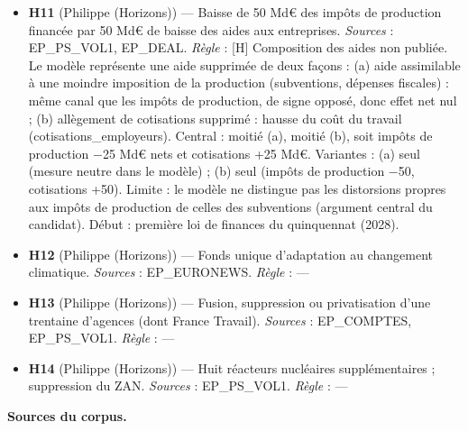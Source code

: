 \documentclass[
  11pt,
  11pt,
  a4paper,
  openany]{book}
\begin{document}
\begin{itemize}
  premier achat (\textless{} 35 ans) ; prêt à taux zéro famille.
  \emph{Sources} : EP\_COMPTES, EP\_PS\_VOL1, EP\_EURONEWS. \emph{Règle}
  : Barèmes non publiés.
\item
  \textbf{H11} (Philippe (Horizons)) --- Baisse de 50 Md€ des impôts de
  production financée par 50 Md€ de baisse des aides aux entreprises.
  \emph{Sources} : EP\_PS\_VOL1, EP\_DEAL. \emph{Règle} : {[}H{]}
  Composition des aides non publiée. Le modèle représente une aide
  supprimée de deux façons : (a) aide assimilable à une moindre
  imposition de la production (subventions, dépenses fiscales) : même
  canal que les impôts de production, de signe opposé, donc effet net
  nul ; (b) allègement de cotisations supprimé : hausse du coût du
  travail (cotisations\_employeurs). Central : moitié (a), moitié (b),
  soit impôts de production −25 Md€ nets et cotisations +25 Md€.
  Variantes : (a) seul (mesure neutre dans le modèle) ; (b) seul (impôts
  de production −50, cotisations +50). Limite : le modèle ne distingue
  pas les distorsions propres aux impôts de production de celles des
  subventions (argument central du candidat). Début : première loi de
  finances du quinquennat (2028).
\item
  \textbf{H12} (Philippe (Horizons)) --- Fonds unique d'adaptation au
  changement climatique. \emph{Sources} : EP\_EURONEWS. \emph{Règle} :
  ---
\item
  \textbf{H13} (Philippe (Horizons)) --- Fusion, suppression ou
  privatisation d'une trentaine d'agences (dont France Travail).
  \emph{Sources} : EP\_COMPTES, EP\_PS\_VOL1. \emph{Règle} : ---
\item
  \textbf{H14} (Philippe (Horizons)) --- Huit réacteurs nucléaires
  supplémentaires ; suppression du ZAN. \emph{Sources} : EP\_PS\_VOL1.
  \emph{Règle} : ---
\end{itemize}

\textbf{Sources du corpus.}
\end{document}

